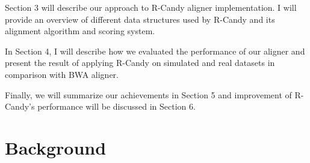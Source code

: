 \documentclass[11pt,a4paper]{report}
\begin{document}
Section 3 will describe our approach to R-Candy aligner implementation.
I will provide an overview of different data structures used by R-Candy and its alignment algorithm and scoring system.

In Section 4, I will describe how we evaluated the performance of our aligner and present the result of applying R-Candy on simulated and real datasets in comparison with BWA aligner.

Finally, we will summarize our achievements in Section 5 and improvement of R-Candy's performance will be discussed in Section 6. 




\clearpage


\section{Background }
\end{document}
